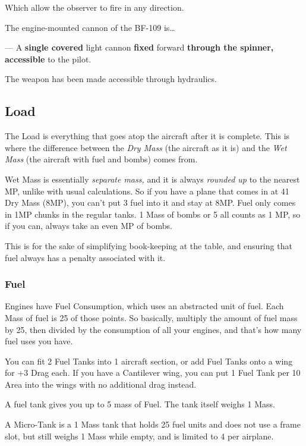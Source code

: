 \documentclass{article}
\begin{document}
Which allow the observer to fire in any direction.

The engine-mounted cannon of the BF-109 is\ldots{}

--- A \textbf{single covered }light cannon
\textbf{fixed} forward\textbf{ through the
  spinner, accessible }to the pilot.

The weapon has been made accessible through hydraulics.

\subsection{Load}
\label{_Load}

The Load is everything that goes atop the aircraft after it is complete.
This is where the difference between the \emph{Dry Mass} (the aircraft
as it is) and the \emph{Wet Mass} (the aircraft with fuel and bombs)
comes from.

Wet Mass is essentially \emph{separate mass, }and it is always
\emph{rounded up }to the nearest MP, unlike with usual calculations. So
if you have a plane that comes in at 41 Dry Mass (8MP), you can't put 3
fuel into it and stay at 8MP. Fuel only comes in 1MP chunks in the
regular tanks. 1 Mass of bombs or 5 all counts as 1 MP, so if you can,
always take an even MP of bombs.

This is for the sake of simplifying book-keeping at the table, and
ensuring that fuel always has a penalty associated with it.

\subsubsection{Fuel}
\label{_Fuel}

Engines have Fuel Consumption, which uses an abstracted unit of fuel.
Each Mass of fuel is 25 of those points. So basically, multiply the
amount of fuel mass by 25, then divided by the consumption of all your
engines, and that's how many fuel uses you have.

You can fit 2 Fuel Tanks into 1 aircraft section, or add Fuel Tanks onto
a wing for +3 Drag each. If you have a Cantilever wing, you can put 1
Fuel Tank per 10 Area into the wings with no additional drag instead.

A fuel tank gives you up to 5 mass of Fuel. The tank itself weighs 1
Mass.

A Micro-Tank is a 1 Mass tank that holds 25 fuel units and does not use
a frame slot, but still weighs 1 Mass while empty, and is limited to 4
per airplane.
\end{document}
